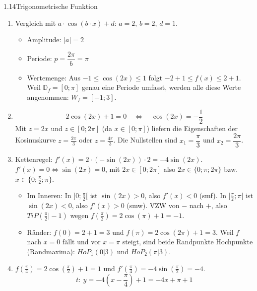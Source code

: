 \begin{loesung}{1.14}{Trigonometrische Funktion}
\begin{enumerate}[label=\alph*)]
  \item Vergleich mit $a\cdot\cos{(b\cdot x)}+d$: $a=2$, $b=2$, $d=1$.
  \begin{itemize}
    \item Amplitude: $|a| = 2$
    \item Periode: $p = \dfrac{2\pi}{b} = \pi$
    \item Wertemenge: Aus $-1\leq\cos{(2x)}\leq 1$ folgt $-2+1\leq f(x)\leq 2+1$. Weil $\mathds{D}_f=[0;\pi]$ genau eine Periode umfasst, werden alle diese Werte angenommen: $W_f = [-1;3]$.
  \end{itemize}
  \item \[2\cos{(2x)}+1 = 0 \quad\Longleftrightarrow\quad \cos{(2x)} = -\dfrac{1}{2}\]
  Mit $z=2x$ und $z\in[0;2\pi]$ (da $x\in[0;\pi]$) liefern die Eigenschaften der Kosinuskurve $z = \frac{2\pi}{3}$ oder $z = \frac{4\pi}{3}$. Die Nullstellen sind $x_1 = \dfrac{\pi}{3}$ und $x_2 = \dfrac{2\pi}{3}$.
  \item Kettenregel: $f'(x) = 2\cdot(-\sin{(2x)})\cdot 2 = -4\sin{(2x)}$.\\
  $f'(x) = 0 \Longleftrightarrow \sin{(2x)}=0$, mit $2x\in[0;2\pi]$ also $2x\in\{0;\pi;2\pi\}$ bzw. $x\in\{0;\frac{\pi}{2};\pi\}$.
  \begin{itemize}
    \item Im Inneren: In $]0;\frac{\pi}{2}[$ ist $\sin{(2x)}>0$, also $f'(x)<0$ (smf). In $]\frac{\pi}{2};\pi[$ ist $\sin{(2x)}<0$, also $f'(x)>0$ (smw). VZW von $-$ nach $+$, also $TiP\left(\frac{\pi}{2}\big|-1\right)$ wegen $f(\frac{\pi}{2}) = 2\cos{(\pi)}+1 = -1$.
    \item Ränder: $f(0) = 2+1 = 3$ und $f(\pi) = 2\cos{(2\pi)}+1 = 3$. Weil $f$ nach $x=0$ fällt und vor $x=\pi$ steigt, sind beide Randpunkte Hochpunkte (Randmaxima): $HoP_1(0|3)$ und $HoP_2(\pi|3)$.
  \end{itemize}
  \item $f\left(\frac{\pi}{4}\right) = 2\cos{\left(\frac{\pi}{2}\right)}+1 = 1$ und $f'\left(\frac{\pi}{4}\right) = -4\sin{\left(\frac{\pi}{2}\right)} = -4$.
  \[t:\ y = -4\left(x-\dfrac{\pi}{4}\right)+1 = -4x+\pi+1\]
\end{enumerate}
\end{loesung}

